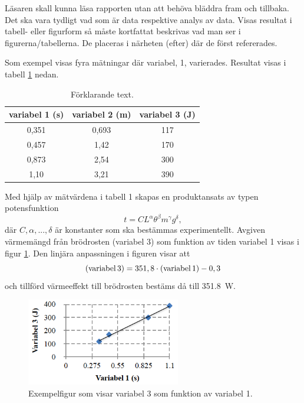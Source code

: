 \documentclass[a4paper]{article}
\begin{document}
Läsaren skall kunna läsa rapporten utan att behöva bläddra fram och tillbaka. Det ska vara tydligt vad som är data respektive analys av data.
Visas resultat i tabell- eller figurform så måste kortfattat beskrivas vad man ser i figurerna/tabellerna. De placeras i närheten (efter) där de först refererades.

Som exempel visas fyra mätningar där variabel, 1, varierades. Resultat visas i tabell \ref{tvariabel123} nedan.


\begin{table}[ht]
\caption{Förklarande text.}
\centering
    \begin{tabular}{c | c | c}
        \hline
        variabel 1 (s) & variabel 2 (m) & variabel 3 (J) \\
        \hline
        0,351 &	0,693 &	117 \\
        0,457 &	1,42 &	170 \\
        0,873 &	2,54 &	300 \\
        1,10 &	3,21 &	390 \\
        \hline
     \end{tabular} 
\label{tvariabel123}
\end{table}

Med hjälp av mätvärdena i tabell 1 skapas en produktansats av typen potensfunktion
\begin{equation}
t = C L^\alpha \theta^\beta m^\gamma g^\delta,
\end{equation}
där $C, \alpha, ..., \delta$ är konstanter som ska bestämmas experimentellt.
Avgiven värmemängd från brödrosten (variabel 3) som funktion av tiden variabel 1 visas i figur \ref{fvariabel3vs1}. Den linjära anpassningen i figuren visar att
\begin{equation}
{\rm (variabel \, 3)} = 351,8 \cdot {\rm (variabel \, 1)} - 0,3
\end{equation}
och tillförd värmeeffekt till brödrosten bestäms då till \SI{351,8}{W}.


\begin{figure}[ht]
\begin{center}
  \includegraphics[width=0.6\textwidth]{fig1.png}
  \caption{Exempelfigur som visar variabel 3 som funktion av variabel 1. \label{fvariabel3vs1}}
\end{center}
\end{figure}
\end{document}
